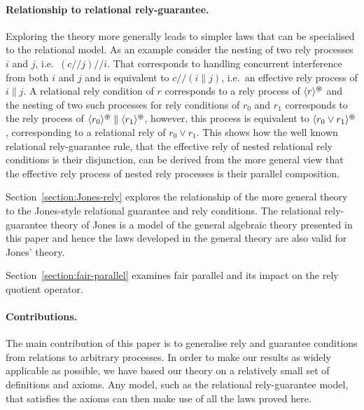 \documentclass[fleqn]{fac}
\newcommand{\atomicrel}[1]{\langle#1\rangle}
\newcommand{\FinSkipIter}{^{\varoast}}
\newcommand{\FinGuar}[1]{\atomicrel{#1}\FinSkipIter}
\newcommand{\quotient}{\mathbin{/\!\!/}}
\begin{document}
\paragraph{Relationship to relational rely-guarantee.}

Exploring the theory more generally 
leads to simpler laws 
that can be specialised to the relational model.
As an example consider the nesting of two rely processes $i$ and $j$, i.e.\ $(c \quotient j) \quotient i$. 
That corresponds to handling concurrent interference from both $i$ and $j$
and is equivalent to $c \quotient (i \parallel j)$,
i.e.\ an effective rely process of $i \parallel j$.
A relational rely condition of $r$ corresponds to a rely process of $\FinGuar{r}$
and the nesting of two such processes for rely conditions of $r_0$ and $r_1$
corresponds to the rely process of 
$\FinGuar{r_0} \parallel \FinGuar{r_1}$,
however, 
this process is equivalent to $\FinGuar{r_0 \lor r_1}$,
corresponding to a relational rely of $r_0 \lor r_1$.
This shows how the well known relational rely-guarantee rule, 
that the effective rely of nested relational rely conditions is their disjunction,
can be derived from the more general view that the effective rely process 
of nested rely processes is their parallel composition.

Section~\ref{section:Jones-rely} explores the relationship 
of the more general theory to the Jones-style relational guarantee and rely conditions.
The relational rely-guarantee theory of Jones \cite{jones96a}
is a model of the general algebraic theory presented in this paper
and hence the laws developed in the general theory are also valid for Jones' theory.


Section~\ref{section:fair-parallel} examines fair parallel and its impact on the rely quotient operator.

\paragraph{Contributions.}

The main contribution of this paper is to generalise rely and guarantee conditions from relations to
arbitrary processes.
In order to make our results as widely applicable as possible,
we have based our theory on a relatively small set of definitions and axioms.
Any model, such as the relational rely-guarantee model, that satisfies the axioms
can then make use of all the laws proved here.
\end{document}
